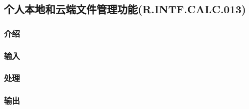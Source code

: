 \subsection{个人本地和云端文件管理功能(R.INTF.CALC.013)}
\subsubsection{介绍}
\subsubsection{输入}
\subsubsection{处理}
\subsubsection{输出}